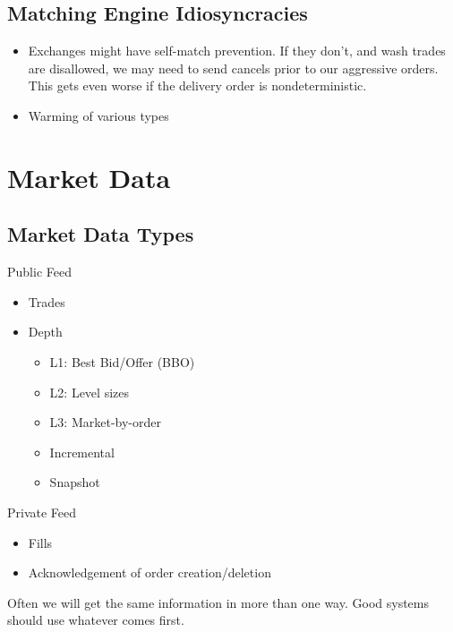 \documentclass{article}
\newif\ifhasdiagram
\newcommand{\sectiondiagram}[1]{%
    \def\insertsdiagram{#1}%
    \hasdiagramtrue
}
\newcommand{\sectionquote}[1]{%
    \def\insertsquote{\small #1}%
}
\newcommand{\insertsdiagram}{}
\newcommand{\insertsquote}{}
\renewcommand{\insertsquote}{}%
\begin{document}
\subsection{Matching Engine Idiosyncracies}
\begin{itemize}
	\item Exchanges might have self-match prevention. If they don't, and wash trades are disallowed, we may need to send cancels prior to our aggressive orders. This gets even worse if the delivery order is nondeterministic.
	\item Warming of various types
\end{itemize}

\sectiondiagram{market}
\sectionquote{``The race is not to the swift, nor the battle to the strong \ldots but time and chance happeneth to them all.'' Ecclesiastes \\ ``The race is not always to the swift, nor the battle to the strong – but that’s the way to bet.'' Anon.}
\section{Market Data}
\subsection{Market Data Types}
\begin{block}{Public Feed}
	\begin{itemize}
	\item Trades
	\item Depth
	\begin{itemize}
	\item L1: Best Bid/Offer (BBO)
	\item L2: Level sizes
	\item L3: Market-by-order%
	\item Incremental
	\item Snapshot
	\end{itemize}
	\end{itemize}
\end{block}
\begin{block}{Private Feed}
	\begin{itemize}
	\item Fills
	\item Acknowledgement of order creation/deletion
	\end{itemize}
\end{block}

Often we will get the same information in more than one way. Good systems should use whatever comes first.
\end{document}
